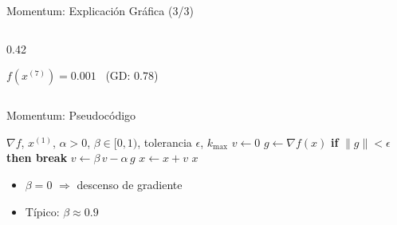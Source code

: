 \begin{frame}{Momentum: Explicación Gráfica (3/3)}
\begin{columns}[T]
\begin{column}{0.42\textwidth}
            \raggedright
            \vspace{0.3em}
            {\small $f(x^{(7)})=0.001$ \ (GD: $0.78$)\par}
        \end{column}
    \end{columns}
\end{frame}

\begin{frame}{Momentum: Pseudocódigo}
    \scriptsize
    \begin{algorithmic}[1]
        \Require $\nabla f$, $x^{(1)}$, $\alpha>0$, $\beta\in[0,1)$, tolerancia $\epsilon$, $k_{\max}$
        \State $v \gets 0$
            \State $g \gets \nabla f(x)$
            \State \textbf{if} $\lVert g \rVert < \epsilon$ \textbf{then break}
            \State $v \gets \beta\, v - \alpha\, g$ 
            \State $x \gets x + v$ 
        \EndFor
        \State \Return $x$
    \end{algorithmic}

    \vspace{1em}
    \small
    \begin{itemize}
        \item $\beta=0$ $\Rightarrow$ descenso de gradiente
        \item Típico: $\beta\approx0.9$
    \end{itemize}
\end{frame}

